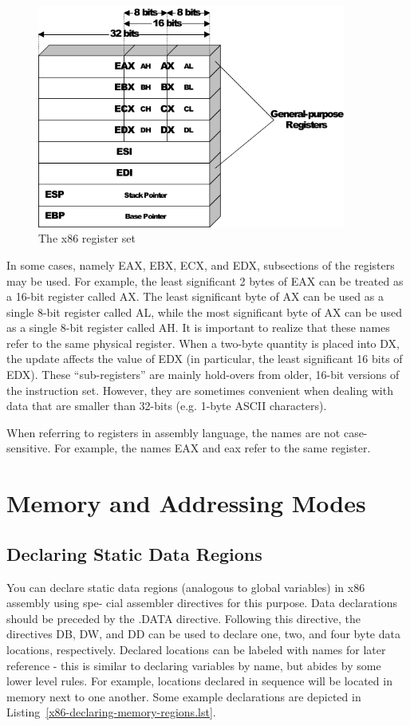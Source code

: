 \begin{figure}[h]
\begin{center}
\includegraphics[width=4in]{x86/x86-register-diagram.pdf}
\end{center}
\caption{The x86 register set}
\label{x86-register-diagram.fig}
\end{figure}

In some cases, namely EAX, EBX, ECX, and EDX, subsections of the
registers may be used.  For example, the least significant 2 bytes of
EAX can be treated as a 16-bit register called AX.  The least
significant byte of AX can be used as a single 8-bit register called
AL, while the most significant byte of AX can be used as a single
8-bit register called AH. It is important to realize that these names
refer to the same physical register. When a two-byte quantity is
placed into DX, the update affects the value of EDX (in particular,
the least significant 16 bits of EDX). These ``sub-registers''
are mainly hold-overs from older, 16-bit versions of the instruction
set. However, they are sometimes convenient when dealing with data
that are smaller than 32-bits (e.g. 1-byte ASCII characters).

When referring to registers in assembly language, the names are not
case-sensitive. For example, the names EAX and eax refer to the same
register.

\section{Memory and Addressing Modes}

\subsection{Declaring Static Data Regions}

You can declare static data regions (analogous to global variables) in
x86 assembly using spe- cial assembler directives for this purpose.
Data declarations should be preceded by the .DATA directive. Following
this directive, the directives DB, DW, and DD can be used to declare
one, two, and four byte data locations, respectively. Declared
locations can be labeled with names for later reference - this is
similar to declaring variables by name, but abides by some lower level
rules. For example, locations declared in sequence will be located in
memory next to one another.  Some example declarations are depicted in
Listing~\ref{x86-declaring-memory-regions.lst}.

